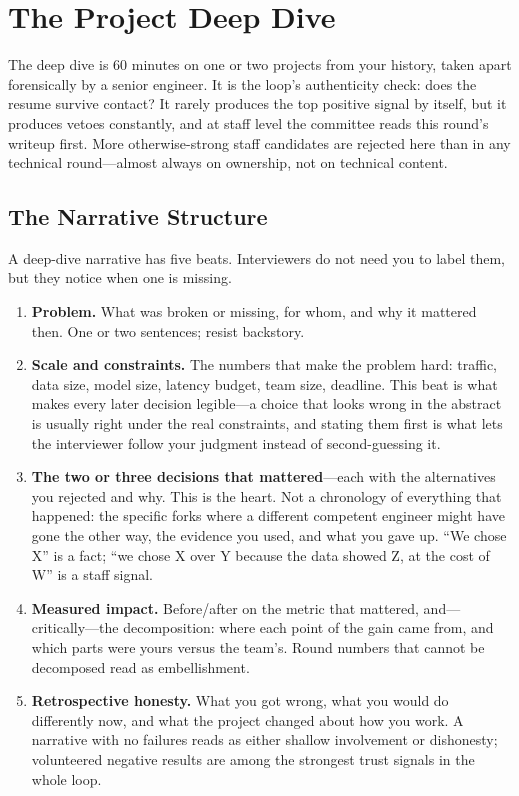 \section{The Project Deep Dive}
\label{sec:project_deep_dive}

The deep dive is 60 minutes on one or two projects from your history, taken apart forensically by a senior engineer. It is the loop's authenticity check: does the resume survive contact? It rarely produces the top positive signal by itself, but it produces vetoes constantly, and at staff level the committee reads this round's writeup first. More otherwise-strong staff candidates are rejected here than in any technical round---almost always on ownership, not on technical content.

\subsection{The Narrative Structure}

A deep-dive narrative has five beats. Interviewers do not need you to label them, but they notice when one is missing.

\begin{enumerate}
    \item \textbf{Problem.} What was broken or missing, for whom, and why it mattered then. One or two sentences; resist backstory.
    \item \textbf{Scale and constraints.} The numbers that make the problem hard: traffic, data size, model size, latency budget, team size, deadline. This beat is what makes every later decision legible---a choice that looks wrong in the abstract is usually right under the real constraints, and stating them first is what lets the interviewer follow your judgment instead of second-guessing it.
    \item \textbf{The two or three decisions that mattered}---each with the alternatives you rejected and why. This is the heart. Not a chronology of everything that happened: the specific forks where a different competent engineer might have gone the other way, the evidence you used, and what you gave up. ``We chose X'' is a fact; ``we chose X over Y because the data showed Z, at the cost of W'' is a staff signal.
    \item \textbf{Measured impact.} Before/after on the metric that mattered, and---critically---the decomposition: where each point of the gain came from, and which parts were yours versus the team's. Round numbers that cannot be decomposed read as embellishment.
    \item \textbf{Retrospective honesty.} What you got wrong, what you would do differently now, and what the project changed about how you work. A narrative with no failures reads as either shallow involvement or dishonesty; volunteered negative results are among the strongest trust signals in the whole loop.
\end{enumerate}

